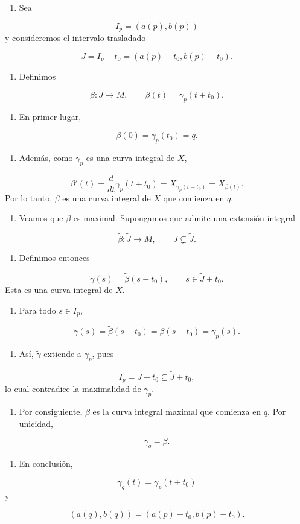 \begin{bookproof}{}
\begin{enumerate}
\item Sea
\end{enumerate}
\[
I_p=(a(p),b(p))
\]
y consideremos el intervalo trasladado

\[
J=I_p-t_0=(a(p)-t_0,b(p)-t_0).
\]
\begin{enumerate}[start=2]
\item Definimos
\end{enumerate}
\[
\beta:J\longrightarrow M,\qquad \beta(t)=\gamma_p(t+t_0).
\]
\begin{enumerate}[start=3]
\item En primer lugar,
\end{enumerate}
\[
\beta(0)=\gamma_p(t_0)=q.
\]
\begin{enumerate}[start=4]
\item Además, como $\gamma_p$ es una curva integral de $X$,
\end{enumerate}
\[
\beta'(t)=\frac{d}{dt}\gamma_p(t+t_0)=X_{\gamma_p(t+t_0)}=X_{\beta(t)}.
\]
Por lo tanto, $\beta$ es una curva integral de $X$ que comienza en $q$.

\begin{enumerate}[start=5]
\item Veamos que $\beta$ es maximal. Supongamos que admite una extensión integral
\end{enumerate}
\[
\widetilde{\beta}:\widetilde{J}\longrightarrow M,\qquad J\subsetneq\widetilde{J}.
\]
\begin{enumerate}[start=6]
\item Definimos entonces
\end{enumerate}
\[
\widetilde{\gamma}(s)=\widetilde{\beta}(s-t_0),\qquad s\in\widetilde{J}+t_0.
\]
Esta es una curva integral de $X$.

\begin{enumerate}[start=7]
\item Para todo $s\in I_p$,
\end{enumerate}
\[
\widetilde{\gamma}(s)=\widetilde{\beta}(s-t_0)=\beta(s-t_0)=\gamma_p(s).
\]
\begin{enumerate}[start=8]
\item Así, $\widetilde{\gamma}$ extiende a $\gamma_p$, pues
\end{enumerate}
\[
I_p=J+t_0\subsetneq\widetilde{J}+t_0,
\]
lo cual contradice la maximalidad de $\gamma_p$.

\begin{enumerate}[start=9]
\item Por consiguiente, $\beta$ es la curva integral maximal que comienza en $q$. Por unicidad,
\end{enumerate}
\[
\gamma_q=\beta.
\]
\begin{enumerate}[start=10]
\item En conclusión,
\end{enumerate}
\[
\gamma_q(t)=\gamma_p(t+t_0)
\]
y

\[
(a(q),b(q))=(a(p)-t_0,b(p)-t_0).
\]
\bookqed
\end{bookproof}
